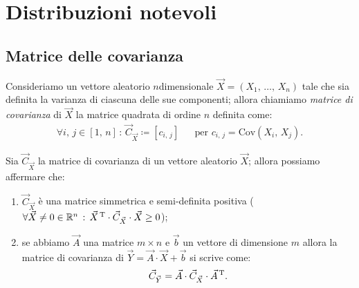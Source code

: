 
\chapter{Distribuzioni notevoli}
    \section{Matrice delle covarianza}\label{defn:Matrice_covarianza}
        \begin{defn}
            Consideriamo un vettore aleatorio $n$\nbdash dimensionale $\vec{X} = (X_1,\, \ldots,\, X_{n})$ tale che sia definita la varianza di ciascuna delle sue componenti; allora chiamiamo \emph{matrice di covarianza} di $\vec{X}$ la matrice quadrata di ordine $n$ definita come:
            \begin{align*}
                \forall i,\,j \in [1,\,n] \,:\, \vec{C}_{\vec{X}} \coloneqq [c_{i,\,j}] & &
                \text{per } c_{i,\,j} = \text{Cov}(X_i,\, X_j)
            .\end{align*}
        \end{defn}
        \begin{prty}
            Sia $\vec{C}_{\vec{X}}$ la matrice di covarianza di un vettore aleatorio $\vec{X}$; allora possiamo affermare che:
            \begin{enumerate}
                \item $\vec{C}_{\vec{X}}$ è una matrice simmetrica e semi-definita positiva 
                    ($\forall \vec{X} \neq 0 \in \mathbb{R}^n \,:\, 
                    \vec{X}^{\text{\,T}}\cdot \vec{C}_{\vec{X}} \cdot \vec{X} \geq 0$);
                \item se abbiamo $\vec{A}$ una matrice $m \times n$ e $\vec{b}$ un vettore di dimensione $m$ allora la matrice di covarianza di $\vec{Y} = \vec{A} \cdot \vec{X} + \vec{b}$ si scrive come: \[
                \vec{C}_{\vec{Y}} = \vec{A} \cdot \vec{C}_{\vec{X}} \cdot \vec{A}^{\text{\,T}}
                .\] 
            \end{enumerate}
        \end{prty}
